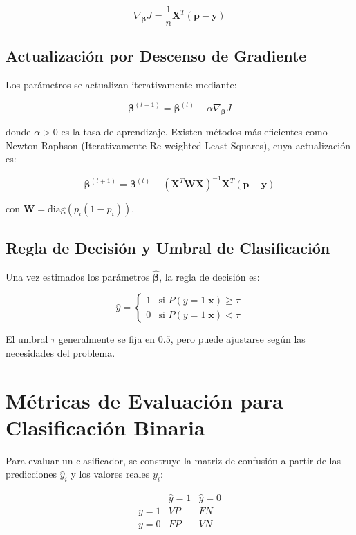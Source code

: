 \documentclass[12pt]{article}
\begin{document}
\[
\nabla_{\boldsymbol{\beta}} J = \frac{1}{n} \mathbf{X}^T (\mathbf{p} - \mathbf{y})
\]

\subsection{Actualización por Descenso de Gradiente}

Los parámetros se actualizan iterativamente mediante:

\[
\boldsymbol{\beta}^{(t+1)} = \boldsymbol{\beta}^{(t)} - \alpha \nabla_{\boldsymbol{\beta}} J
\]

donde $\alpha > 0$ es la tasa de aprendizaje. Existen métodos más eficientes como Newton-Raphson (Iterativamente Re-weighted Least Squares), cuya actualización es:

\[
\boldsymbol{\beta}^{(t+1)} = \boldsymbol{\beta}^{(t)} - (\mathbf{X}^T \mathbf{W} \mathbf{X})^{-1} \mathbf{X}^T (\mathbf{p} - \mathbf{y})
\]

con $\mathbf{W} = \text{diag}(p_i(1-p_i))$.

\subsection{Regla de Decisión y Umbral de Clasificación}

Una vez estimados los parámetros $\hat{\boldsymbol{\beta}}$, la regla de decisión es:

\[
\hat{y} = 
\begin{cases}
1 & \text{si } P(y=1|\mathbf{x}) \geq \tau \\
0 & \text{si } P(y=1|\mathbf{x}) < \tau
\end{cases}
\]

El umbral $\tau$ generalmente se fija en $0.5$, pero puede ajustarse según las necesidades del problema.

\section{Métricas de Evaluación para Clasificación Binaria}



Para evaluar un clasificador, se construye la matriz de confusión a partir de las predicciones $\hat{y}_i$ y los valores reales $y_i$:

\[
\begin{array}{c|cc}
 & \hat{y}=1 & \hat{y}=0 \\
\hline
y=1 & VP & FN \\
y=0 & FP & VN \\
\end{array}
\]
\end{document}
